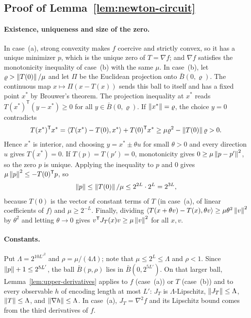 \subsection{Proof of Lemma~\ref{lem:newton-circuit}}
\label{app:upper-newton-proof}

\paragraph{Existence, uniqueness and size of the zero.}
In case~(a), strong convexity makes $f$ coercive and strictly convex, so it
has a unique minimizer $p$, which is the unique zero of $T=\nabla f$; and
$\nabla f$ satisfies the monotonicity inequality of case~(b) with the same
$\mu$. In case~(b), let $\varrho>\left\lVert T(0)\right\rVert/\mu$ and let
$\Pi$ be the Euclidean projection onto $\bar B(0,\varrho)$. The continuous map
$x\mapsto\Pi(x-T(x))$ sends this ball to itself and has a fixed point $x^*$ by
Brouwer's theorem. The projection inequality at $x^*$ reads
$T(x^*)^{\mathsf T}(y-x^*)\ge0$ for all $y\in\bar B(0,\varrho)$. If
$\left\lVert x^*\right\rVert=\varrho$, the choice $y=0$ contradicts
\[
 T(x^*)^{\mathsf T}x^*
 =\left\langle T(x^*)-T(0),x^*\right\rangle+T(0)^{\mathsf T}x^*
 \ge\mu\varrho^2-\left\lVert T(0)\right\rVert\varrho>0 .
\]
Hence $x^*$ is interior, and choosing $y=x^*\pm\theta u$ for small $\theta>0$
and every direction $u$ gives $T(x^*)=0$. If $T(p)=T(p')=0$, monotonicity
gives $0\ge\mu\left\lVert p-p'\right\rVert^2$, so the zero $p$ is unique. Applying the
inequality to $p$ and $0$ gives $\mu\left\lVert p\right\rVert^2\le-T(0)^{\mathsf T}p$, so
\[
 \left\lVert p\right\rVert\le\left\lVert T(0)\right\rVert/\mu\le2^{2L}\cdot2^L=2^{3L},
\]
because $T(0)$ is the vector of constant terms of $T$ (in case~(a), of
linear coefficients of $f$) and $\mu\ge2^{-L}$. Finally, dividing
$\left\langle T(x+\theta v)-T(x),\theta v\right\rangle\ge\mu\theta^2\left\lVert v\right\rVert^2$ by $\theta^2$ and
letting $\theta\to0$ gives $v^{\mathsf T}J_T(x)v\ge\mu\left\lVert v\right\rVert^2$ for all
$x,v$.

\paragraph{Constants.}
Put $\Lambda=2^{10L'^2}$ and $\rho=\mu/(4\Lambda)$; note that
$\mu\le2^L\le\Lambda$ and $\rho<1$. Since $\left\lVert p\right\rVert+1\le2^{5L'}$, the ball
$\bar B(p,\rho)$ lies in $\bar B(0,2^{5L'})$. On that larger ball,
Lemma~\ref{lem:upper-derivatives} applies to $f$ (case~(a)) or $T$ (case~(b))
and to every observable $h$ of encoding length at most $L'$: $J_T$ is
$\Lambda$-Lipschitz, $\left\lVert J_T\right\rVert\le\Lambda$, $\left\lVert T\right\rVert\le\Lambda$, and
$\left\lVert\nabla h\right\rVert\le\Lambda$. In case~(a), $J_T=\nabla^2f$ and its Lipschitz
bound comes from the third derivatives of $f$.

